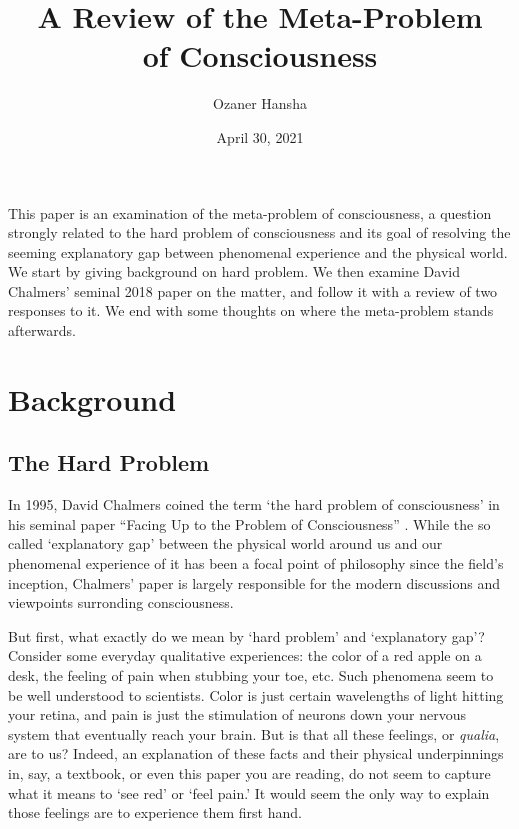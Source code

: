 \documentclass[11pt]{article}
\makeatletter
\let\oldabstract\abstract
\let\oldendabstract\endabstract
\renewenvironment{abstract}
{\renewenvironment{quotation}%
  {\list{}{\addtolength{\leftmargin}{3em} %
      \listparindent 1.5em%
      \itemindent    \listparindent%
      \rightmargin   \leftmargin%
      \parsep        \z@ \@plus\p@}%
    \item\relax}%
  {\endlist}%
\oldabstract}
{\oldendabstract}
\makeatother
\begin{document}
\title{A Review of the Meta-Problem\\of Consciousness}
\author{Ozaner Hansha}
\date{April 30, 2021}
\maketitle

\doublespacing

\begin{abstract}
    This paper is an examination of the meta-problem of consciousness, a question strongly related to the hard problem of consciousness and its goal of resolving the seeming explanatory gap between phenomenal experience and the physical world. We start by giving background on hard problem. We then examine David Chalmers' seminal 2018 paper on the matter, and follow it with a review of two responses to it. We end with some thoughts on where the meta-problem stands afterwards.
\end{abstract}

\section*{Background}
\subsection*{The Hard Problem}
In 1995, David Chalmers coined the term `the hard problem of consciousness' in his seminal paper ``Facing Up to the Problem of Consciousness'' \cite{Chalmers95facingup}. While the so called `explanatory gap' between the physical world around us and our phenomenal experience of it has been a focal point of philosophy since the field's inception, Chalmers' paper is largely responsible for the modern discussions and viewpoints surronding consciousness.

But first, what exactly do we mean by `hard problem' and `explanatory gap'? Consider some everyday qualitative experiences: the color of a red apple on a desk, the feeling of pain when stubbing your toe, etc. Such phenomena seem to be well understood to scientists. Color is just certain wavelengths of light hitting your retina, and pain is just the stimulation of neurons down your nervous system that eventually reach your brain. But is that all these feelings, or \textit{qualia}, are to us? Indeed, an explanation of these facts and their physical underpinnings in, say, a textbook, or even this paper you are reading, do not seem to capture what it means to `see red' or `feel pain.' It would seem the only way to explain those feelings are to experience them first hand.
\end{document}

